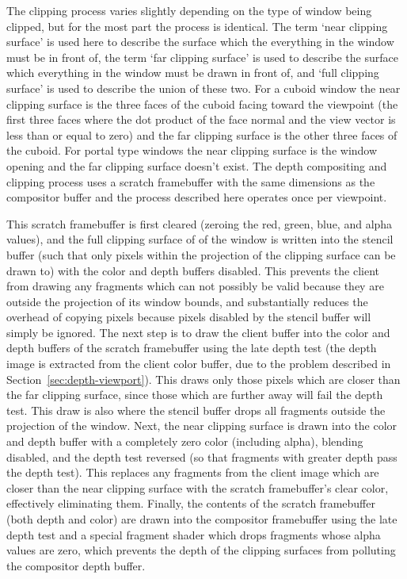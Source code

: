 The clipping process varies slightly depending on the type of window being clipped, but for the most part the process is identical. The term `near clipping surface' is used here to describe the surface which the everything in the window must be in front of, the term `far clipping surface' is used to describe the surface which everything in the window must be drawn in front of, and `full clipping surface' is used to describe the union of these two. For a cuboid window the near clipping surface is the three faces of the cuboid facing toward the viewpoint (the first three faces where the dot product of the face normal and the view vector is less than or equal to zero) and the far clipping surface is the other three faces of the cuboid. For portal type windows the near clipping surface is the window opening and the far clipping surface doesn't exist. The depth compositing and clipping process uses a scratch framebuffer with the same dimensions as the compositor buffer and the process described here operates once per viewpoint.

This scratch framebuffer is first cleared (zeroing the red, green, blue, and alpha values), and the full clipping surface of of the window is written into the stencil buffer (such that only pixels within the projection of the clipping surface can be drawn to) with the color and depth buffers disabled. This prevents the client from drawing any fragments which can not possibly be valid because they are outside the projection of its window bounds, and substantially reduces the overhead of copying pixels because pixels disabled by the stencil buffer will simply be ignored. The next step is to draw the client buffer into the color and depth buffers of the scratch framebuffer using the late depth test (the depth image is extracted from the client color buffer, due to the problem described in Section~\ref{sec:depth-viewport}). This draws only those pixels which are closer than the far clipping surface, since those which are further away will fail the depth test. This draw is also where the stencil buffer drops all fragments outside the projection of the window. Next, the near clipping surface is drawn into the color and depth buffer with a completely zero color (including alpha), blending disabled, and the depth test reversed (so that fragments with greater depth pass the depth test). This replaces any fragments from the client image which are closer than the near clipping surface with the scratch framebuffer's clear color, effectively eliminating them. Finally, the contents of the scratch framebuffer (both depth and color) are drawn into the compositor framebuffer using the late depth test and a special fragment shader which drops fragments whose alpha values are zero, which prevents the depth of the clipping surfaces from polluting the compositor depth buffer. 

